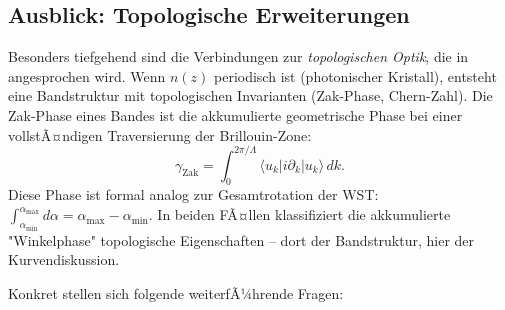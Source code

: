﻿\documentclass[12pt, a4paper]{article}
\theoremstyle{definition}
\begin{document}
	\subsection{Ausblick: Topologische Erweiterungen}
	
	Besonders tiefgehend sind die Verbindungen zur \emph{topologischen Optik},
	die in \cite{oqtum} angesprochen wird. Wenn $n(z)$ periodisch ist (photonischer
	Kristall), entsteht eine Bandstruktur mit topologischen Invarianten (Zak-Phase,
	Chern-Zahl). Die Zak-Phase eines Bandes ist die akkumulierte geometrische
	Phase bei einer vollstÃ¤ndigen Traversierung der Brillouin-Zone:
	\[
	\gamma_\mathrm{Zak} = \int_0^{2\pi/\Lambda} \langle u_k | i\partial_k | u_k \rangle\, dk.
	\]
	Diese Phase ist formal analog zur Gesamtrotation der WST:
	$\int_{\alpha_\mathrm{min}}^{\alpha_\mathrm{max}} d\alpha = \alpha_\mathrm{max} - \alpha_\mathrm{min}$.
	In beiden FÃ¤llen klassifiziert die akkumulierte "Winkelphase" topologische
	Eigenschaften -- dort der Bandstruktur, hier der Kurvendiskussion.
	
	Konkret stellen sich folgende weiterfÃ¼hrende Fragen:
	
\end{document}

